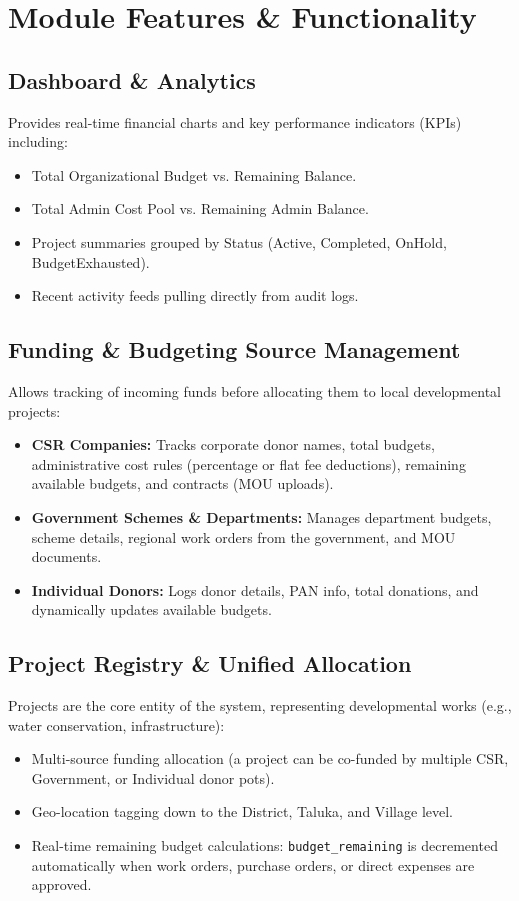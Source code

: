 \documentclass[11pt,a4paper]{article}
\begin{document}
\newpage
\section{Module Features \& Functionality}

\subsection{Dashboard \& Analytics}
Provides real-time financial charts and key performance indicators (KPIs) including:
\begin{itemize}
    \item Total Organizational Budget vs. Remaining Balance.
    \item Total Admin Cost Pool vs. Remaining Admin Balance.
    \item Project summaries grouped by Status (Active, Completed, OnHold, BudgetExhausted).
    \item Recent activity feeds pulling directly from audit logs.
\end{itemize}

\subsection{Funding \& Budgeting Source Management}
Allows tracking of incoming funds before allocating them to local developmental projects:
\begin{itemize}
    \item \textbf{CSR Companies:} Tracks corporate donor names, total budgets, administrative cost rules (percentage or flat fee deductions), remaining available budgets, and contracts (MOU uploads).
    \item \textbf{Government Schemes \& Departments:} Manages department budgets, scheme details, regional work orders from the government, and MOU documents.
    \item \textbf{Individual Donors:} Logs donor details, PAN info, total donations, and dynamically updates available budgets.
\end{itemize}

\subsection{Project Registry \& Unified Allocation}
Projects are the core entity of the system, representing developmental works (e.g., water conservation, infrastructure):
\begin{itemize}
    \item Multi-source funding allocation (a project can be co-funded by multiple CSR, Government, or Individual donor pots).
    \item Geo-location tagging down to the District, Taluka, and Village level.
    \item Real-time remaining budget calculations: \texttt{budget\_remaining} is decremented automatically when work orders, purchase orders, or direct expenses are approved.
\end{itemize}
\end{document}

